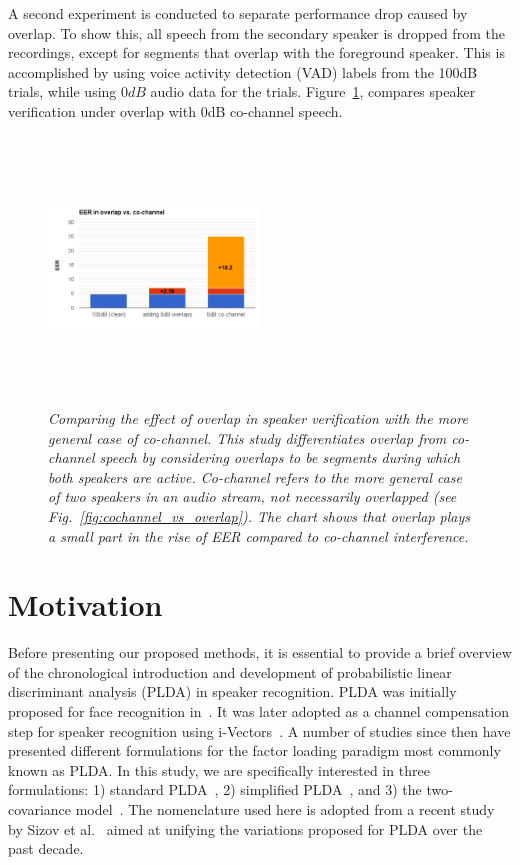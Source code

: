 A second experiment is conducted to separate performance drop caused by overlap. To show this, all speech from the secondary speaker is dropped from the recordings, except for segments that overlap with the foreground speaker. 
This is accomplished by using voice activity detection (VAD) labels from the 100dB trials, while using $0dB$ audio data for the trials. 
Figure~\ref{fig:ovl_in_sid}, compares speaker verification under overlap with 0dB co-channel speech. 

\begin{figure}[h!]
	\vspace{-1mm}
	\centering
	\includegraphics[height = 2.8in, width=0.5\textwidth]{figures/overlap_vs_cochannel_sid-crop}
	\vspace{-8mm}
	\caption{\it \small Comparing the effect of overlap in speaker verification with the more general case of co-channel. This study differentiates overlap from co-channel speech by considering overlaps to be segments during which both speakers are active. Co-channel refers to the more general case of two speakers in an audio stream, not necessarily overlapped (see Fig.~\ref{fig:cochannel_vs_overlap}). The chart shows that overlap plays a small part in the rise of EER compared to co-channel interference.}
	\label{fig:ovl_in_sid}
	\vspace{-1mm}
\end{figure}


\section{Motivation}
\label{sec:background}
Before presenting our proposed methods, it is essential to provide a brief overview of the chronological introduction and development of probabilistic linear discriminant analysis (PLDA) in speaker recognition. 
PLDA was initially proposed for face recognition in~\cite{prince_plda}. 
It was later adopted as a channel compensation step for speaker recognition using i-Vectors~\cite{kenny2010bayesian}. 
A number of studies since then have presented different formulations for the factor loading paradigm most commonly known as PLDA. 
In this study, we are specifically interested in three formulations: 1) standard PLDA~\cite{kenny_plda}, 2) simplified PLDA~\cite{kenny_plda2,Daniel2011is}, and 3) the two-covariance model~\cite{brummer2010twocov}. 
The nomenclature used here is adopted from a recent study by Sizov et al.~\cite{sizov2014unifying} aimed at unifying the variations proposed for PLDA over the past decade. 


